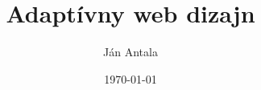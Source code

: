 \documentclass[11pt,a4paper]{article}
\title{\bfseries{ \bf Adaptívny web dizajn}}
\author{Ján Antala}
\date{\today}
\begin{document}


\newpage

\newpage

\onehalfspacing  %
\setlength{\parindent}{1cm} %
\setcounter{page}{1}

\newpage

\newpage



% 




\newpage
\begin{appendices}

\end{appendices}
\end{document}
